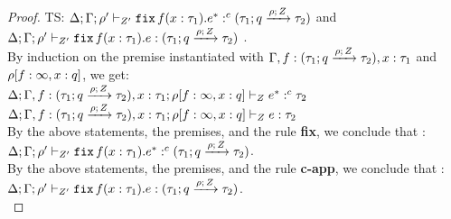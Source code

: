 \begin{proof}
    TS: $  \Delta; \Gamma; \rho' \vdash_{ Z'} { \mathop{\mathtt{fix}} f(x: \tau_1).e^* } :^c  (\tau_1; q \xrightarrow{\rho; \, Z} \tau_2)   $ and $   \Delta; \Gamma; \rho' \vdash_{Z'} \mathop{\mathtt{fix}} f(x: \tau_1).e :  (\tau_1; q \xrightarrow{\rho; \, Z} \tau_2) $ .\\
    By induction on the premise instantiated with $\Gamma, f: (\tau_1; q \xrightarrow{\rho; \, Z} \tau_2), x: \tau_1$ and $ \rho[f: \infty, x: q] $, we get: \\
    $ \Delta; \Gamma, f: (\tau_1; q \xrightarrow{\rho; \, Z} \tau_2), x: \tau_1;
      \rho[f: \infty, x: q] \vdash_{ Z} { e^* } :^c  \tau_2   $ \\
    $ \Delta; \Gamma, f: (\tau_1; q \xrightarrow{\rho; \, Z} \tau_2), x: \tau_1;
      \rho[f: \infty, x: q] \vdash_{Z} e :  \tau_2   $ \\  
       By the above statements, the premises, and the rule \textbf{fix}, we conclude that :  $  \Delta; \Gamma; \rho' \vdash_{ Z'} { \mathop{\mathtt{fix}} f(x: \tau_1).e^* } :^c  (\tau_1; q \xrightarrow{\rho; \, Z} \tau_2)   $. \\
     By the above statements, the premises, and the rule \textbf{c-app}, we conclude that :  $   \Delta; \Gamma; \rho' \vdash_{Z'} \mathop{\mathtt{fix}} f(x: \tau_1).e :  (\tau_1; q \xrightarrow{\rho; \, Z} \tau_2) $. \\
    

\end{proof}

